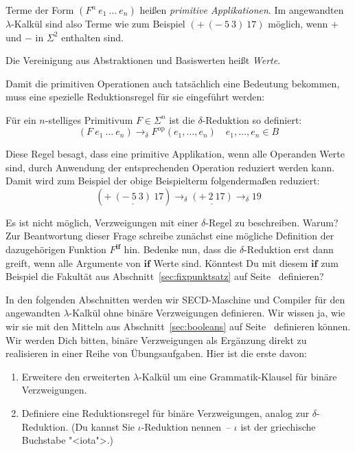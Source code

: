 Terme der Form $(F^n~e_1~\ldots~e_n)$ heißen
\textit{primitive Applikationen}.
Im angewandten $\lambda$-Kalkül sind also
Terme wie zum Beispiel $(+~(-~5~3)~17)$ möglich, wenn $+$ und $-$ in
$\Sigma^2$ enthalten sind.
%
\begin{definition}\label{def:wert-angewandt}
  Die Vereinigung aus Abstraktionen und
  Basiswerten heißt \textit{Werte}.
\end{definition}
%
Damit die primitiven Operationen auch tatsächlich eine Bedeutung
bekommen, muss eine spezielle Reduktionsregel für sie eingeführt
werden:
%
\begin{definition}
  Für ein $n$-stelliges Primitivum $F\in\Sigma^n$ ist die
  $\delta$-Reduktion so definiert:
\begin{displaymath}
  (F~e_1~\ldots~e_n) \rightarrow_{\delta} F^{\textrm{op}}(e_1, \ldots, e_n)
  \quad e_1, \ldots, e_n \in B
\end{displaymath}
\end{definition}
\vspace{-1ex}
%
Diese Regel besagt, dass eine primitive Applikation, wenn alle
Operanden Werte sind, durch Anwendung der entsprechenden Operation 
reduziert werden kann.  Damit wird zum Beispiel der
obige Beispielterm folgendermaßen reduziert:
%
\begin{displaymath}
  (+~\underline{(-~5~3)}~17) \rightarrow_{\delta} \underline{(+~2~17)} \rightarrow_{\delta} 19
\end{displaymath}
%
\begin{aufgabeinline}
  Es ist nicht möglich, Verzweigungen mit einer
  $\delta$-Regel zu beschreiben.  Warum?  Zur Beantwortung dieser
  Frage schreibe zunächst eine mögliche Definition der dazugehörigen
  Funktion $F^\mathbf{if}$ hin.  Bedenke nun, dass die
  $\delta$-Reduktion erst dann greift, wenn alle Argumente von
  $\mathbf{if}$ Werte sind.  Könntest Du mit diesem $\mathbf{if}$ zum
  Beispiel die Fakultät aus Abschnitt~\ref{sec:fixpunktsatz} auf
  Seite~\pageref{sec:fixpunktsatz} definieren?
\end{aufgabeinline}
%
In den folgenden Abschnitten werden wir SECD-Maschine und Compiler
für den angewandten $\lambda$-Kalkül ohne binäre Verzweigungen
definieren.  Wir wissen ja, wie wir sie mit den Mitteln aus
Abschnitt~\ref{sec:booleans} auf Seite~\pageref{sec:booleans}
definieren können.
Wir werden Dich bitten, binäre Verzweigungen als Ergänzung
direkt zu realisieren in einer Reihe von Übungsaufgaben.  Hier ist die
erste davon:
%
\begin{aufgabeinline}
  \begin{enumerate}
  \item Erweitere den erweiterten $\lambda$-Kalkül um eine
    Grammatik-Klausel für binäre Verzweigungen.
  \item Definiere eine Reduktionsregel für binäre Verzweigungen,
    analog zur $\delta$-Reduktion.  (Du kannst Sie $\iota$-Reduktion
    nennen~-- $\iota$ ist der griechische Buchstabe "<iota">.)
  \end{enumerate}
\end{aufgabeinline}

